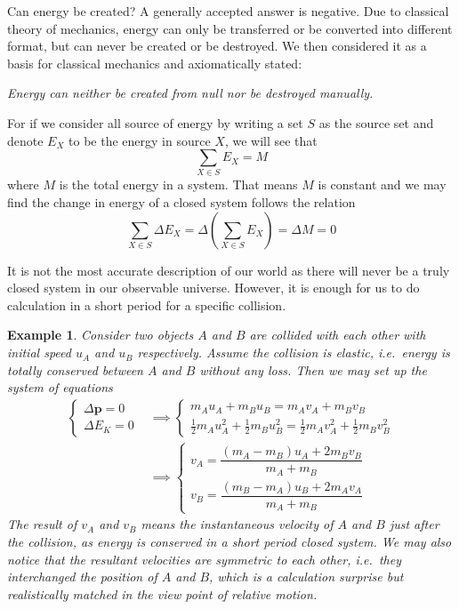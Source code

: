 \documentclass[12pt]{article}
\newtheorem*{example}{Example}
\begin{document}
    Can energy be created? A generally accepted answer is negative. Due to classical theory of mechanics, energy can only be transferred or be converted into different format, but can never be created or be destroyed. We then considered it as a basis for classical mechanics and axiomatically stated:

    \begin{center}
        \textit{Energy can neither be created from null nor be destroyed manually.}
    \end{center}

    For if we consider all source of energy by writing a set $S$ as the source set and denote $E_X$ to be the energy in source $X$, we will see that \[\sum_{X\in S}E_X = M\] where $M$ is the total energy in a system. That means $M$ is constant and we may find the change in energy of a closed system follows the relation \[\sum_{X\in S} \Delta E_X = \Delta (\sum_{X\in S} E_X) = \Delta M = 0\]

    It is not the most accurate description of our world as there will never be a truly closed system in our observable universe. However, it is enough for us to do calculation in a short period for a specific collision.

    \begin{example}
        Consider two objects $A$ and $B$ are collided with each other with initial speed $u_A$ and $u_B$ respectively. Assume the collision is elastic, i.e.\ energy is totally conserved between $A$ and $B$ without any loss. Then we may set up the system of equations \begin{align*}
            \begin{cases}
                \Delta \mathbf{p} = 0\\
                \Delta E_K = 0
            \end{cases}&\implies \begin{cases}
                m_A u_A + m_B u_B = m_A v_A + m_B v_B\\
                \frac{1}{2}m_A u_A^2+\frac{1}{2}m_B u_B^2=\frac{1}{2}m_A v_A^2+\frac{1}{2}m_B v_B^2
            \end{cases}\\
            &\implies \begin{cases}
                v_A=\dfrac{(m_A-m_B)u_A+2m_B v_B}{m_A+m_B}\\
                v_B=\dfrac{(m_B-m_A)u_B+2m_A v_A}{m_A+m_B}
            \end{cases}
        \end{align*}
        The result of $v_A$ and $v_B$ means the instantaneous velocity of $A$ and $B$ just after the collision, as energy is conserved in a short period closed system. We may also notice that the resultant velocities are symmetric to each other, i.e.\ they interchanged the position of $A$ and $B$, which is a calculation surprise but realistically matched in the view point of relative motion.
    \end{example}
\end{document}
